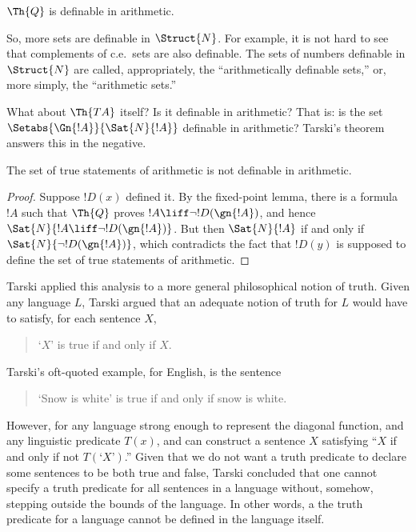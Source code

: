 \documentclass[../../include/open-logic-section]{subfiles}
\begin{document}
\begin{cor}
$\Th{Q}$ is definable in arithmetic.
\end{cor}

So, more sets are definable in $\Struct{N}$. For example, it is not hard
to see that complements of c.e.\ sets are also definable. The sets of
numbers definable in $\Struct{N}$ are called, appropriately, the
``arithmetically definable sets,'' or, more simply, the ``arithmetic
sets.'' 

What about $\Th{TA}$ itself? Is it definable in arithmetic? That
is: is the set $\Setabs{\Gn{!A}}{\Sat{N}{!A}}$ definable in
arithmetic? Tarski's theorem answers this in the negative.

\begin{thm}
The set of true statements of arithmetic is not definable in arithmetic.
\end{thm}

\begin{proof} 
Suppose $!D(x)$ defined it. By the fixed-point lemma, there is a
formula $!A$ such that $\Th{Q}$ proves $!A \liff \lnot !D(\gn{!A})$,
and hence $\Sat{N}{!A \liff \lnot !D(\gn{!A})}$. But then
$\Sat{N}{!A}$ if and only if $\Sat{N}{\lnot !D(\gn{!A})}$, which
contradicts the fact that $!D(y)$ is supposed to define the set of true
statements of arithmetic.  
\end{proof}

Tarski applied this analysis to a more general philosophical notion of
truth. Given any language $L$, Tarski argued that an adequate notion
of truth for $L$ would have to satisfy, for each sentence $X$,
\begin{quote}
`$X$' is true if and only if $X$.
\end{quote}
Tarski's oft-quoted example, for English, is the sentence
\begin{quote}
`Snow is white' is true if and only if snow is white.
\end{quote}
However, for any language strong enough to represent the diagonal
function, and any linguistic predicate $T(x)$, and can construct a
sentence $X$ satisfying ``$X$ if and only if not $T(\text{`$X$'})$.''
Given that we do not want a truth predicate to declare some sentences
to be both true and false, Tarski concluded that one cannot specify a
truth predicate for all sentences in a language without, somehow,
stepping outside the bounds of the language. In other words, a the
truth predicate for a language cannot be defined in the language
itself.
\end{document}
